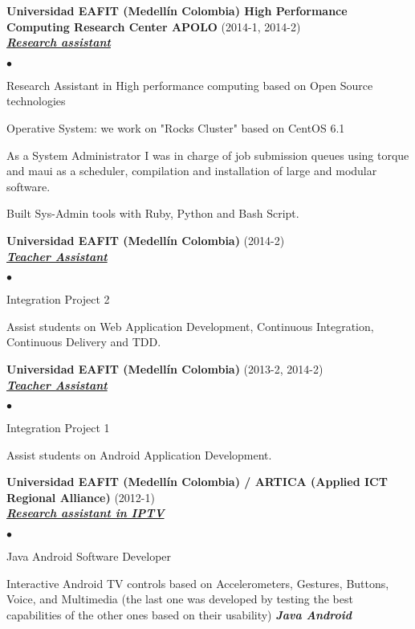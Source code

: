 \documentclass[a4paper]{article}
\newcommand{\employer}[3]{{
\textbf{#1} (#2)\\ \underline{\textbf{\emph{#3}}}\\ }}
\newenvironment{achievements}{\begin{list}{$\bullet$}{\topsep 0pt \itemsep
-2pt}}{\vspace*{4pt}\end{list}}
\newcommand{\emphasys}[1]{\textbf{\emph{#1}}}
\begin{document}
\employer{ Universidad EAFIT (Medell\'in Colombia) High Performance Computing Research Center APOLO}{2014-1, 2014-2}{Research assistant}
\begin{achievements}
\item Research Assistant in High performance computing based on Open Source technologies
\item Operative System: we work on "Rocks Cluster" based on CentOS 6.1
\item As a System Administrator I was in charge of job submission queues using torque and maui as a scheduler, compilation and installation of large and modular software.
\item Built Sys-Admin tools with Ruby, Python and Bash Script.
\end{achievements}

\newpage

\employer{ Universidad EAFIT (Medell\'in Colombia) }{2014-2}{Teacher Assistant}
\begin{achievements}
\item Integration Project 2
\item Assist students on Web Application Development, Continuous Integration, Continuous Delivery and TDD.
\end{achievements}

\employer{ Universidad EAFIT (Medell\'in Colombia) }{2013-2, 2014-2}{Teacher Assistant}
\begin{achievements}
\item Integration Project 1
\item Assist students on Android Application Development.
\end{achievements}

\employer{ Universidad EAFIT (Medell\'in Colombia) / ARTICA (Applied ICT Regional Alliance)} {2012-1} {Research assistant in IPTV}
\begin{achievements}
\item Java Android Software Developer
\item Interactive Android TV controls based on Accelerometers, Gestures, Buttons, Voice, and Multimedia (the last one was developed by testing the best capabilities of the other ones based on their usability) \emphasys{Java Android}
\end{achievements}

\end{document}
